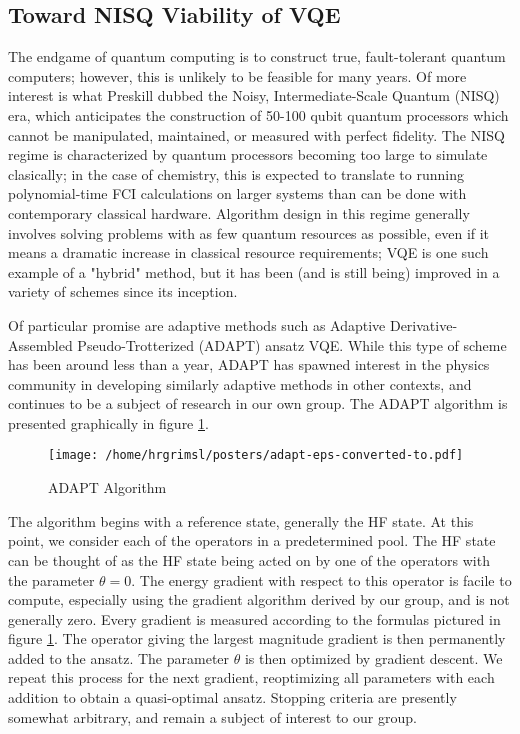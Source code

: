\documentclass{article}
\begin{document}
\subsection{Toward NISQ Viability of VQE}
\begin{paragraph}{}
The endgame of quantum computing is to construct true, fault-tolerant quantum computers; however, this is unlikely to be feasible for many years. \cite{preskill} Of more interest is what Preskill dubbed the Noisy, Intermediate-Scale Quantum (NISQ) era, which anticipates the construction of 50-100 qubit quantum processors which cannot be manipulated, maintained, or measured with perfect fidelity. \cite{preskill} The NISQ regime is characterized by quantum processors becoming too large to simulate clasically; in the case of chemistry, this is expected to translate to running polynomial-time FCI calculations on larger systems than can be done with contemporary classical hardware. \cite{preskill, alan}  Algorithm design in this regime generally involves solving problems with as few quantum resources as possible, even if it means a dramatic increase in classical resource requirements; VQE is one such example of a "hybrid" method, but it has been (and is still being) improved in a variety of schemes since its inception. \cite{preskill, benedetti, grimsley, joonho}
\end{paragraph}
\begin{paragraph}{} 
Of particular promise are adaptive methods such as Adaptive Derivative-Assembled Pseudo-Trotterized (ADAPT) ansatz VQE. \cite{grimsley} While this type of scheme has been around less than a year, ADAPT has spawned interest in the physics community in developing similarly adaptive methods in other contexts, and continues to be a subject of research in our own group. \cite{benedetti,iqcc} The ADAPT algorithm is presented graphically in figure \ref{adapt}. \cite{grimsley}\begin{figure}[h!]\caption{ADAPT Algorithm}\label{adapt}

\texttt{[image: /home/hrgrimsl/posters/adapt-eps-converted-to.pdf]}
\end{figure}  
\end{paragraph}
\begin{paragraph}{}
The algorithm begins with a reference state, generally the HF state.  At this point, we consider each of the operators in a predetermined pool. The HF state can be thought of as the HF state being acted on by one of the operators with the parameter $\theta=0$.  The energy gradient with respect to this operator is facile to compute, especially using the gradient algorithm derived by our group, and is not generally zero. \cite{grimsley} Every gradient is measured according to the formulas pictured in figure \ref{adapt}.  The operator giving the largest magnitude gradient is then permanently added to the ansatz.  The parameter $\theta$ is then optimized by gradient descent.  We repeat this process for the next gradient, reoptimizing all parameters with each addition to obtain a quasi-optimal ansatz.  Stopping criteria are presently somewhat arbitrary, and remain a subject of interest to our group.    
\end{paragraph}
\end{document}
